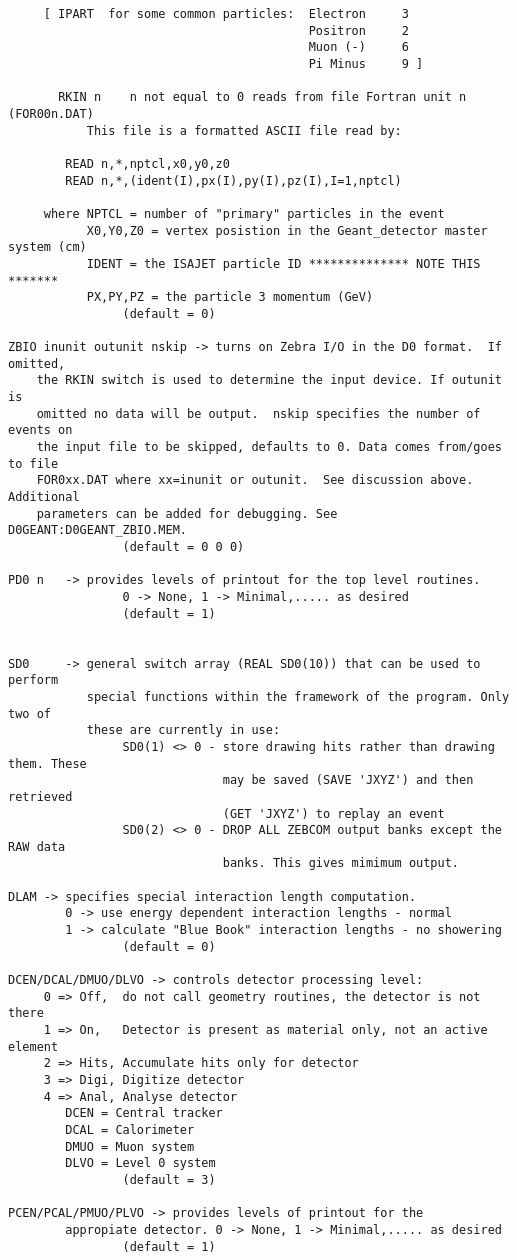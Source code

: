 \begin{verbatim}
     [ IPART  for some common particles:  Electron     3
                                          Positron     2
                                          Muon (-)     6
                                          Pi Minus     9 ]

       RKIN n    n not equal to 0 reads from file Fortran unit n (FOR00n.DAT)
           This file is a formatted ASCII file read by:

        READ n,*,nptcl,x0,y0,z0
        READ n,*,(ident(I),px(I),py(I),pz(I),I=1,nptcl)

     where NPTCL = number of "primary" particles in the event
           X0,Y0,Z0 = vertex posistion in the Geant_detector master system (cm)
           IDENT = the ISAJET particle ID ************** NOTE THIS *******
           PX,PY,PZ = the particle 3 momentum (GeV)
                (default = 0)

ZBIO inunit outunit nskip -> turns on Zebra I/O in the D0 format.  If omitted,
    the RKIN switch is used to determine the input device. If outunit is
    omitted no data will be output.  nskip specifies the number of events on
    the input file to be skipped, defaults to 0. Data comes from/goes to file
    FOR0xx.DAT where xx=inunit or outunit.  See discussion above. Additional
    parameters can be added for debugging. See D0GEANT:D0GEANT_ZBIO.MEM.
                (default = 0 0 0)

PD0 n   -> provides levels of printout for the top level routines.
                0 -> None, 1 -> Minimal,..... as desired
                (default = 1)


SD0     -> general switch array (REAL SD0(10)) that can be used to perform
           special functions within the framework of the program. Only two of
           these are currently in use:
                SD0(1) <> 0 - store drawing hits rather than drawing them. These
                              may be saved (SAVE 'JXYZ') and then retrieved
                              (GET 'JXYZ') to replay an event
                SD0(2) <> 0 - DROP ALL ZEBCOM output banks except the RAW data
                              banks. This gives mimimum output.

DLAM -> specifies special interaction length computation.
        0 -> use energy dependent interaction lengths - normal
        1 -> calculate "Blue Book" interaction lengths - no showering
                (default = 0)

DCEN/DCAL/DMUO/DLVO -> controls detector processing level:
     0 => Off,  do not call geometry routines, the detector is not there
     1 => On,   Detector is present as material only, not an active element
     2 => Hits, Accumulate hits only for detector
     3 => Digi, Digitize detector
     4 => Anal, Analyse detector
        DCEN = Central tracker
        DCAL = Calorimeter
        DMUO = Muon system
        DLVO = Level 0 system
                (default = 3)

PCEN/PCAL/PMUO/PLVO -> provides levels of printout for the
        appropiate detector. 0 -> None, 1 -> Minimal,..... as desired
                (default = 1)
\end{verbatim}

